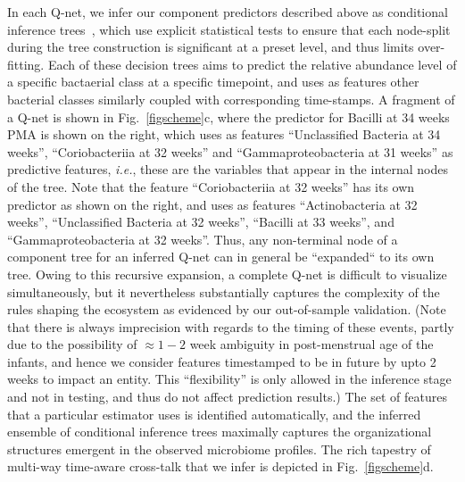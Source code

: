 \documentclass[onecolumn,10pt]{IEEEtran}
\def\qnet{Q-net\xspace}
\begin{document}
In each \qnet, we infer our component predictors described above as  conditional inference trees~\cite{hothorn2006unbiased,sarda2017conditional}, which use explicit statistical tests to ensure that each node-split during the tree construction is significant at a preset level, and thus limits over-fitting. Each of these decision trees aims to predict the relative abundance level of a specific bactaerial class at a specific timepoint,  and uses as features other bacterial classes similarly coupled with corresponding time-stamps. A fragment of a \qnet is shown in Fig.~\ref{figscheme}c, where the predictor for Bacilli at 34 weeks PMA is shown on the right, which uses as features ``Unclassified Bacteria at 34 weeks'', ``Coriobacteriia at 32 weeks'' and ``Gammaproteobacteria at 31 weeks'' as predictive features, \textit{i.e.}, these are the variables that appear in the internal nodes of the tree. Note that the feature ``Coriobacteriia at 32 weeks''  has its own predictor as shown on the right, and  uses as features ``Actinobacteria at 32 weeks'', ``Unclassified Bacteria at 32 weeks'', ``Bacilli at 33 weeks'', and ``Gammaproteobacteria at 32 weeks''. Thus, any non-terminal node of a component tree for an inferred \qnet can in general be ``expanded`` to its own tree. Owing to this recursive expansion,  a complete \qnet is difficult to visualize simultaneously, but it nevertheless substantially captures the complexity of the  rules shaping  the ecosystem as evidenced by our out-of-sample validation.  (Note that there is always imprecision with regards to the timing of these events, partly due to the possibility of $\approx 1-2$ week   ambiguity in post-menstrual age of the infants, and hence we consider features timestamped to be in future by upto 2 weeks to impact an entity. This ``flexibility'' is only allowed in the inference stage and not in testing, and thus do not affect prediction results.) The set of features that a particular estimator uses is identified automatically, and the inferred ensemble of conditional inference  trees  maximally captures the organizational structures emergent in the observed microbiome profiles. The rich tapestry of multi-way time-aware cross-talk that we infer is depicted in Fig.~\ref{figscheme}d.
\end{document}
